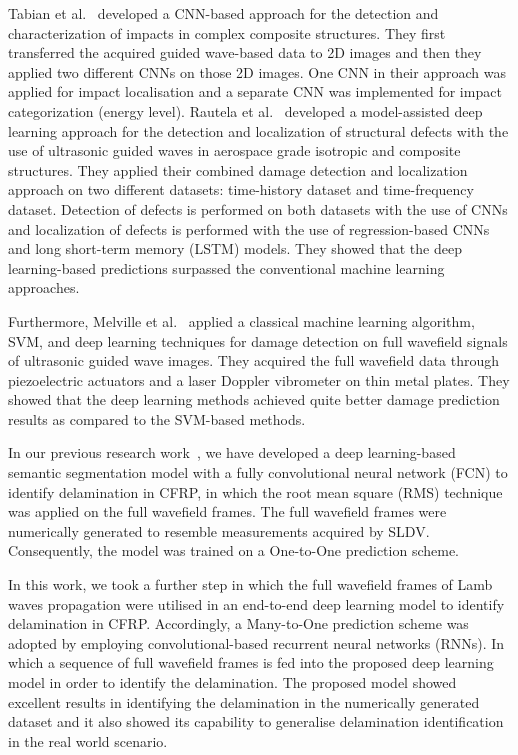 Tabian et al.~\cite{tabian2019convolutional} developed a CNN-based approach for the detection and characterization of impacts in complex composite structures.
They first transferred the acquired guided wave-based data to 2D images and then they applied two different CNNs on those 2D images.
One CNN in their approach was applied for impact localisation and a separate CNN was implemented for impact categorization (energy level).
Rautela et al.~\cite{rautela2021ultrasonic} developed a model-assisted deep learning approach for the detection and localization of structural defects
with the use of ultrasonic guided waves in aerospace grade isotropic and composite structures. 
They applied their combined damage detection and localization approach on two different datasets: time-history dataset and time-frequency dataset. 
Detection of defects is performed on both datasets with the use of CNNs and localization of defects is performed with the use of regression-based CNNs and long short-term memory (LSTM) models. 
They showed that the deep learning-based predictions surpassed the conventional machine learning approaches.

Furthermore, Melville et al.~\cite{melville2018structural} applied a classical machine learning algorithm, SVM, and deep learning techniques for damage detection on full wavefield signals of ultrasonic guided wave images.
They acquired the full wavefield data through piezoelectric actuators and a laser Doppler vibrometer on thin metal plates. 
They showed that the deep learning methods achieved quite better damage prediction results as compared to the SVM-based methods. 

In our previous research work~\cite{ijjeh2021full}, we have developed a deep learning-based semantic segmentation model with a fully convolutional neural network (FCN) to identify delamination in CFRP, in which the root mean square (RMS) technique was applied on the full wavefield frames. 
The full wavefield frames were numerically generated to resemble measurements acquired by SLDV.  
Consequently, the model was trained on a One-to-One prediction scheme.

In this work, we took a further step in which the full wavefield frames of Lamb waves propagation were utilised in an end-to-end deep learning model to identify delamination in CFRP.
Accordingly,  a Many-to-One prediction scheme was adopted by employing convolutional-based recurrent neural networks (RNNs).
In which a sequence of full wavefield frames is fed into the proposed deep learning model in order to identify the delamination.
The proposed model showed excellent results in identifying the delamination in the numerically generated dataset and it also showed its capability to generalise delamination identification in the real world scenario.   
